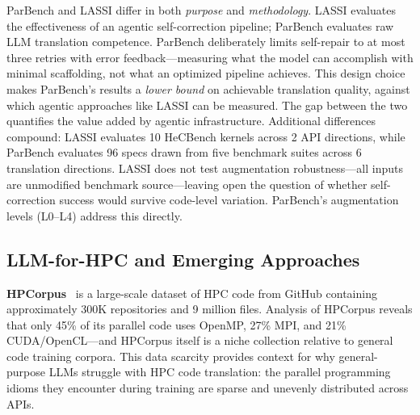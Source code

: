 \documentclass[conference]{IEEEtran}
\begin{document}
ParBench and LASSI differ in both \emph{purpose} and \emph{methodology}. LASSI evaluates the effectiveness of an agentic self-correction pipeline; ParBench evaluates raw LLM translation competence. ParBench deliberately limits self-repair to at most three retries with error feedback---measuring what the model can accomplish with minimal scaffolding, not what an optimized pipeline achieves. This design choice makes ParBench's results a \emph{lower bound} on achievable translation quality, against which agentic approaches like LASSI can be measured. The gap between the two quantifies the value added by agentic infrastructure. Additional differences compound: LASSI evaluates 10 HeCBench kernels across 2 API directions, while ParBench evaluates 96 specs drawn from five benchmark suites across 6 translation directions. LASSI does not test augmentation robustness---all inputs are unmodified benchmark source---leaving open the question of whether self-correction success would survive code-level variation. ParBench's augmentation levels (L0--L4) address this directly.


\subsection{LLM-for-HPC and Emerging Approaches}
\label{sec:llm-hpc}

\textbf{HPCorpus}~\cite{HPCorpus2023} is a large-scale dataset of HPC code from GitHub containing approximately 300K repositories and 9 million files. Analysis of HPCorpus reveals that only 45\% of its parallel code uses OpenMP, 27\% MPI, and 21\% CUDA/OpenCL---and HPCorpus itself is a niche collection relative to general code training corpora. This data scarcity provides context for why general-purpose LLMs struggle with HPC code translation: the parallel programming idioms they encounter during training are sparse and unevenly distributed across APIs.

\end{document}
